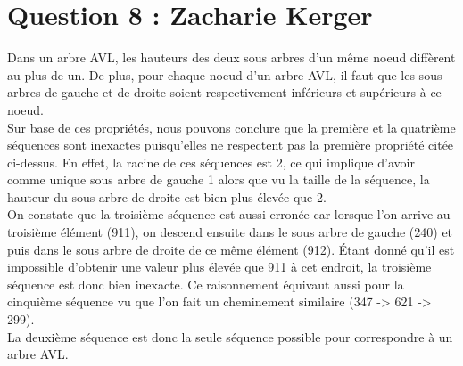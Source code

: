\documentclass[10pt,a4paper]{article}
\begin{document}
\section*{Question 8 : Zacharie Kerger}

Dans un arbre AVL, les hauteurs des deux sous arbres d'un même noeud diffèrent au plus de un. De plus, pour chaque noeud d'un arbre AVL, il faut que les sous arbres de gauche et de droite soient respectivement inférieurs et supérieurs à ce noeud. \\
Sur base de ces propriétés, nous pouvons conclure que la première et la quatrième séquences sont inexactes puisqu'elles ne respectent pas la première propriété citée ci-dessus. En effet, la racine de ces séquences est 2, ce qui implique d'avoir comme unique sous arbre de gauche 1 alors que vu la taille de la séquence, la hauteur du sous arbre de droite est bien plus élevée que 2.\\
On constate que la troisième séquence est aussi erronée car lorsque l'on arrive au troisième élément (911), on descend ensuite dans le sous arbre de gauche (240) et puis dans le sous arbre de droite de ce même élément (912). Étant donné qu'il est impossible d'obtenir une valeur plus élevée que 911 à cet endroit, la troisième séquence est donc bien inexacte. Ce raisonnement équivaut aussi pour la cinquième séquence vu que l'on fait un cheminement similaire (347 -> 621 -> 299).\\
La deuxième séquence est donc la seule séquence possible pour correspondre à un arbre AVL.
\end{document}
